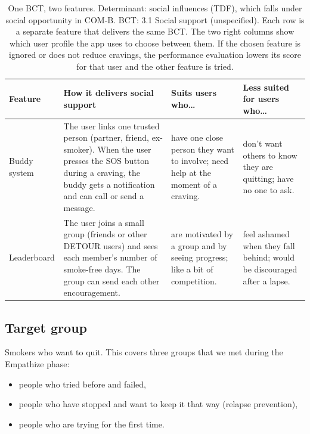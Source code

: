 \begin{table}[htbp]
    \centering
    \small
    \begin{tabularx}{\textwidth}{>{\raggedright\arraybackslash}p{} >{\raggedright\arraybackslash}X >{\raggedright\arraybackslash}p{} >{\raggedright\arraybackslash}p{}}
        \toprule
        \textbf{Feature} & \textbf{How it delivers social support} & \textbf{Suits users who\ldots} & \textbf{Less suited for users who\ldots} \\
        \midrule
        Buddy system & The user links one trusted person (partner, friend, ex-smoker). When the user presses the SOS button during a craving, the buddy gets a notification and can call or send a message. & have one close person they want to involve; need help at the moment of a craving. & don't want others to know they are quitting; have no one to ask. \\
        Leaderboard & The user joins a small group (friends or other DETOUR users) and sees each member's number of smoke-free days. The group can send each other encouragement. & are motivated by a group and by seeing progress; like a bit of competition. & feel ashamed when they fall behind; would be discouraged after a lapse. \\
        \bottomrule
    \end{tabularx}
    \caption{One BCT, two features. Determinant: social influences (TDF), which falls under social opportunity in COM-B. BCT: 3.1 Social support (unspecified). Each row is a separate feature that delivers the same BCT. The two right columns show which user profile the app uses to choose between them. If the chosen feature is ignored or does not reduce cravings, the performance evaluation lowers its score for that user and the other feature is tried.}
    \label{tab:bct-mapping}
\end{table}

\subsection{Target group}
\label{subsec:target-group}

Smokers who want to quit. This covers three groups that we met during the Empathize phase:

\begin{itemize}
    \item people who tried before and failed,
    \item people who have stopped and want to keep it that way (relapse prevention),
    \item people who are trying for the first time.
\end{itemize}


